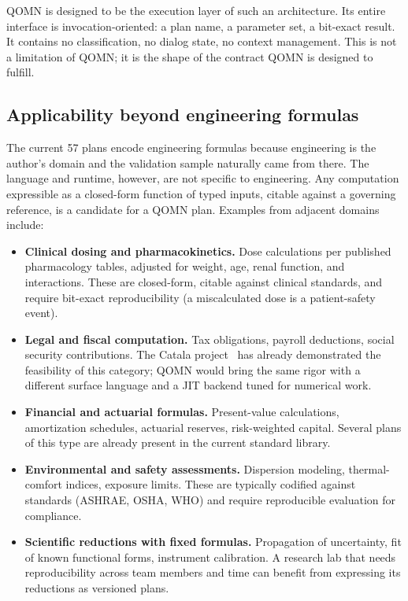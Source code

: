 \documentclass[11pt,a4paper]{article}
\begin{document}
\begin{enumerate}[leftmargin=*]
QOMN is designed to be the execution layer of such an architecture. Its entire interface is invocation-oriented: a plan name, a parameter set, a bit-exact result. It contains no classification, no dialog state, no context management. This is not a limitation of QOMN; it is the shape of the contract QOMN is designed to fulfill.

\subsection{Applicability beyond engineering formulas}

The current 57 plans encode engineering formulas because engineering is the author's domain and the validation sample naturally came from there. The language and runtime, however, are not specific to engineering. Any computation expressible as a closed-form function of typed inputs, citable against a governing reference, is a candidate for a QOMN plan. Examples from adjacent domains include:

\begin{itemize}[leftmargin=*]
\item \textbf{Clinical dosing and pharmacokinetics.} Dose calculations per published pharmacology tables, adjusted for weight, age, renal function, and interactions. These are closed-form, citable against clinical standards, and require bit-exact reproducibility (a miscalculated dose is a patient-safety event).
\item \textbf{Legal and fiscal computation.} Tax obligations, payroll deductions, social security contributions. The Catala project~\cite{catala} has already demonstrated the feasibility of this category; QOMN would bring the same rigor with a different surface language and a JIT backend tuned for numerical work.
\item \textbf{Financial and actuarial formulas.} Present-value calculations, amortization schedules, actuarial reserves, risk-weighted capital. Several plans of this type are already present in the current standard library.
\item \textbf{Environmental and safety assessments.} Dispersion modeling, thermal-comfort indices, exposure limits. These are typically codified against standards (ASHRAE, OSHA, WHO) and require reproducible evaluation for compliance.
\item \textbf{Scientific reductions with fixed formulas.} Propagation of uncertainty, fit of known functional forms, instrument calibration. A research lab that needs reproducibility across team members and time can benefit from expressing its reductions as versioned plans.
\end{itemize}


\end{enumerate}
\end{document}
